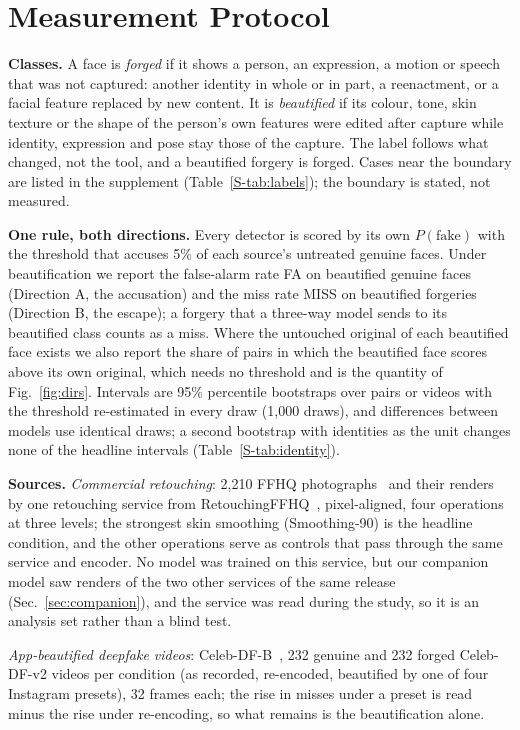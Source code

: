\documentclass[journal]{IEEEtran}  %
\begin{document}
\section{Measurement Protocol}
\label{sec:protocol}
\textbf{Classes.} A face is \emph{forged} if it shows a person, an expression, a motion or speech that was not captured:
another identity in whole or in part, a reenactment, or a facial feature replaced by new content. It is \emph{beautified} if
its colour, tone, skin texture or the shape of the person's own features were edited after capture while identity,
expression and pose stay those of the capture. The label follows what changed, not the tool, and a beautified forgery is
forged. Cases near the boundary are listed in the supplement (Table~\ref{S-tab:labels}); the boundary is stated, not
measured.

\textbf{One rule, both directions.} Every detector is scored by its own $P(\text{fake})$ with the threshold that accuses
5\% of each source's untreated genuine faces. Under beautification we report the false-alarm rate FA on beautified genuine
faces (Direction A, the accusation) and the miss rate MISS on beautified forgeries (Direction B, the escape); a forgery that a
three-way model sends to its beautified class counts as a miss. Where the untouched original of each beautified face exists
we also report the share of pairs in which the beautified face scores above its own original, which needs no threshold and
is the quantity of Fig.~\ref{fig:dirs}. Intervals are 95\% percentile bootstraps over pairs or videos with the threshold
re-estimated in every draw (1,000 draws), and differences between models use identical draws; a second bootstrap with
identities as the unit changes none of the headline intervals (Table~\ref{S-tab:identity}).

\textbf{Sources.} \emph{Commercial retouching}: 2,210 FFHQ photographs~\cite{ffhq} and their renders by one retouching
service from RetouchingFFHQ~\cite{retouchingffhq}, pixel-aligned, four operations at three levels; the strongest skin
smoothing (Smoothing-90) is the headline condition, and the other operations serve as controls that pass through the same
service and encoder. No model was trained on this service, but our companion model saw renders of the two other services of the same release (Sec.~\ref{sec:companion}), and the service was read during the study, so it is an analysis set rather than a blind test.

\emph{App-beautified deepfake videos}: Celeb-DF-B~\cite{libourel2024}, 232 genuine and 232 forged
Celeb-DF-v2 videos per condition (as recorded, re-encoded, beautified by one of four Instagram presets), 32 frames each; the
rise in misses under a preset is read minus the rise under re-encoding, so what remains is the beautification alone.
\end{document}
